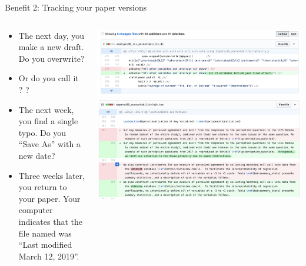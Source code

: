\documentclass[ignorenonframetext, 10pt, aspectratio=169]{beamer}
\begin{document}
\begin{frame}{Benefit 2: Tracking your paper versions}
\begin{columns}[T]
\begin{column}{0.4\textwidth}
\small
\begin{itemize}
\item The next day, you make a new draft. Do you overwrite?\pause
\item Or do you call it  ? ?\pause
\item The next week, you find a single typo. Do you ``Save As'' with a new date?\pause
\item Three weeks later, you return to your paper.   Your computer indicates that the file named  was ``Last modified March 12, 2019''.
\end{itemize}
\end{column}
\begin{column}{0.6\textwidth}\pause
\includegraphics[width = \linewidth]{writing-diff-1.png}
\includegraphics[width = \linewidth]{writing-diff-2.png}
\end{column}
\end{columns}
\end{frame}
\end{document}
